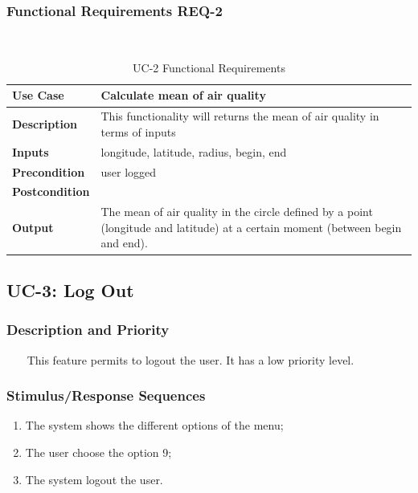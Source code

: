 \documentclass{report}
\begin{document}
\subsubsection*{Functional Requirements REQ-2} ~~~
\begin{table}[H]
	\begin{center}
		\begin{tabular}{|m{4cm}|m{10cm}|}
		\hline
		\textbf{Use Case} & Calculate mean of air quality \\
		\hline
		\textbf{Description} & This functionality will returns the mean of air quality in terms of inputs \\
		\hline
		\textbf{Inputs} & longitude, latitude, radius, begin, end \\
		\hline
		\textbf{Precondition} &  user logged\\
		\hline
		\textbf{Postcondition} &  \\
		\hline
		\textbf{Output} & The mean of air quality in the circle defined by a point (longitude and latitude) at a certain moment (between begin and end).\\
		\hline
		\end{tabular}
	\end{center}
	\caption{UC-2 Functional Requirements}
	\label{table:REQ-2}
\end{table}

\subsection{UC-3: Log Out}

\subsubsection*{Description and Priority} ~~~
This feature permits to logout the user. It has a low priority level.

\subsubsection*{Stimulus/Response Sequences}
\begin{enumerate}
	\item The system shows the different options of the menu;
	\item The user choose the option 9;
	\item The system logout the user.
\end{enumerate}
\end{document}
